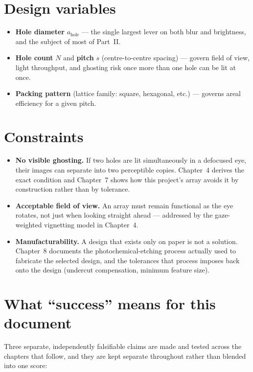 \documentclass[11pt]{report}
\begin{document}
\section{Design variables}

\begin{itemize}[leftmargin=1.2cm]
\item \textbf{Hole diameter} $a_{\text{hole}}$ --- the single largest lever on both blur and
brightness, and the subject of most of Part~II.
\item \textbf{Hole count} $N$ and \textbf{pitch} $s$ (centre-to-centre spacing) --- govern
field of view, light throughput, and ghosting risk once more than one hole can be lit at
once.
\item \textbf{Packing pattern} (lattice family: square, hexagonal, etc.) --- governs areal
efficiency for a given pitch.
\end{itemize}

\section{Constraints}

\begin{itemize}[leftmargin=1.2cm]
\item \textbf{No visible ghosting.} If two holes are lit simultaneously in a defocused eye,
their images can separate into two perceptible copies. Chapter~4 derives the exact
condition and Chapter~7 shows how this project's array avoids it by construction rather
than by tolerance.
\item \textbf{Acceptable field of view.} An array must remain functional as the eye
rotates, not just when looking straight ahead --- addressed by the gaze-weighted vignetting
model in Chapter~4.
\item \textbf{Manufacturability.} A design that exists only on paper is not a solution.
Chapter~8 documents the photochemical-etching process actually used to fabricate the
selected design, and the tolerances that process imposes back onto the design (undercut
compensation, minimum feature size).
\end{itemize}

\section{What ``success'' means for this document}

Three separate, independently falsifiable claims are made and tested across the chapters
that follow, and they are kept separate throughout rather than blended into one score:
\end{document}
